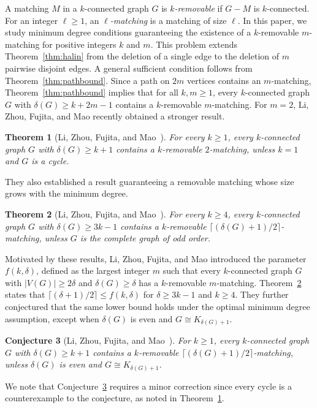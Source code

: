 \documentclass[11pt]{article}
\numberwithin{equation}{section}
\newtheorem{theorem}{Theorem}[section]
\newtheorem{conjecture}[theorem]{Conjecture}
\begin{document}
 A matching $M$ in a $k$-connected graph $G$ is \emph{$k$-removable} if $G-M$ is $k$-connected. 
For an integer $\ell\ge1$, an \emph{$\ell$-matching} is a matching of size $\ell$.
In this paper, we study minimum degree conditions guaranteeing the existence of a $k$-removable $m$-matching for positive integers $k$ and $m$. 
This problem extends Theorem~\ref{thm:halin} from the deletion of a single edge to the deletion of $m$ pairwise disjoint edges.
A general sufficient condition follows from Theorem~\ref{thm:pathbound}. %
Since a path on $2m$ vertices contains an $m$-matching, Theorem~\ref{thm:pathbound} implies that for all $k,m\ge 1$, every $k$-connected graph $G$ with $\delta(G)\ge k+2m-1$ contains a $k$-removable $m$-matching. 
For $m=2$, Li, Zhou, Fujita, and Mao \cite{lzfm} recently obtained a  stronger result.


\begin{theorem}[Li, Zhou, Fujita, and Mao~\cite{lzfm}]\label{thm:lzfm}
For every $k\ge 1$, every $k$-connected graph $G$ with $\delta(G)\ge k+1$
contains a $k$-removable $2$-matching, unless $k=1$ and $G$ is a cycle.
\end{theorem}

They also established a result guaranteeing a removable matching whose size grows with the minimum degree.

\begin{theorem}[Li, Zhou, Fujita, and Mao~\cite{lzfm}]\label{thm:lzfm_delta}
For every $k\ge 4$, every $k$-connected graph $G$ with $\delta(G)\ge 3k-1$ contains a $k$-removable $\bigl\lceil(\delta(G)+1)/2\bigr\rceil$-matching, unless $G$ is the complete graph of odd order.
\end{theorem}


Motivated by these results, Li, Zhou, Fujita, and Mao introduced the parameter $f(k,\delta)$, defined as the largest integer $m$ such that every $k$-connected graph $G$ with $|V(G)|\ge 2\delta$ and $\delta(G)\ge \delta$ has a $k$-removable $m$-matching. 
Theorem~\ref{thm:lzfm_delta} states that $\bigl\lceil(\delta+1)/2\bigr\rceil\le f(k,\delta)$ for $\delta\ge 3k-1$ and $k\ge 4$. They further conjectured that the same lower bound holds under the optimal minimum degree assumption, except when $\delta(G)$ is even and $G \cong K_{\delta(G)+1}$.

\begin{conjecture}[Li, Zhou, Fujita, and Mao~\cite{lzfm}]\label{conj:lzfm}
For $k\ge 1$, every $k$-connected graph $G$ with $\delta(G)\ge k+1$ contains a
$k$-removable $\bigl\lceil(\delta(G)+1)/2\bigr\rceil$-matching, unless
$\delta(G)$ is even and $G\cong K_{\delta(G)+1}$.
\end{conjecture}
We note that Conjecture~\ref{conj:lzfm} requires a minor correction since every cycle is a counterexample to the conjecture, as noted in Theorem~\ref{thm:lzfm}.
\end{document}
